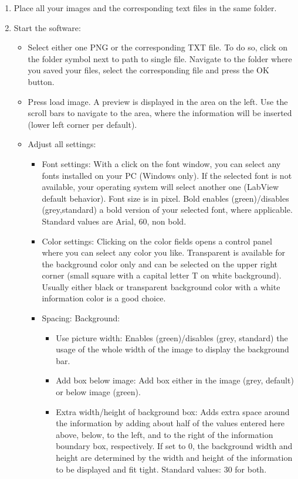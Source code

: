 \documentclass[english]{scrartcl}
\begin{document}
\begin{enumerate}
	\item Place all your images and the corresponding text files in the same folder.
	\item Start the software:
	\begin{itemize}
		\item Select either one PNG or the corresponding TXT file. To do so, click on the folder symbol next to path to single file. Navigate to the folder where you saved your files, select the corresponding file and press the OK button.
		\item Press load image. A preview is displayed in the area on the left. Use the scroll bars to navigate to the area, where the information will be inserted (lower left corner per default).
		\item Adjust all settings:
			\begin{itemize}
				\item Font settings: With a click on the font window, you can select any fonts installed on your PC (Windows only). If the selected font is not available, your operating system will select another one (LabView default behavior). Font size is in pixel. Bold enables (green)/disables (grey,standard) a bold version of your selected font, where applicable. Standard values are Arial, 60, non bold.
				\item Color settings: Clicking on the color fields opens a control panel where you can select any color you like. Transparent is available for the background color only and can be selected on the upper right corner (small square with a capital letter T on white background). Usually either black or transparent background color with a white information color is a good choice.
				\item Spacing:
					Background:
					\begin{itemize}
						\item Use picture width: Enables (green)/disables (grey, standard) the usage of the whole width of the image to display the background bar.									\item Add box below image: Add box either in the image (grey, default) or below image (green).
						\item Extra width/height of background box: Adds extra space around the information by adding about half of the values entered here above, below, to the left, and to the right of the information boundary box, respectively. If set to 0, the background width and height are determined by the width and height of the information to be displayed and fit tight. Standard values: 30 for both.

\end{itemize}
\end{itemize}
\end{itemize}
\end{enumerate}
\end{document}
